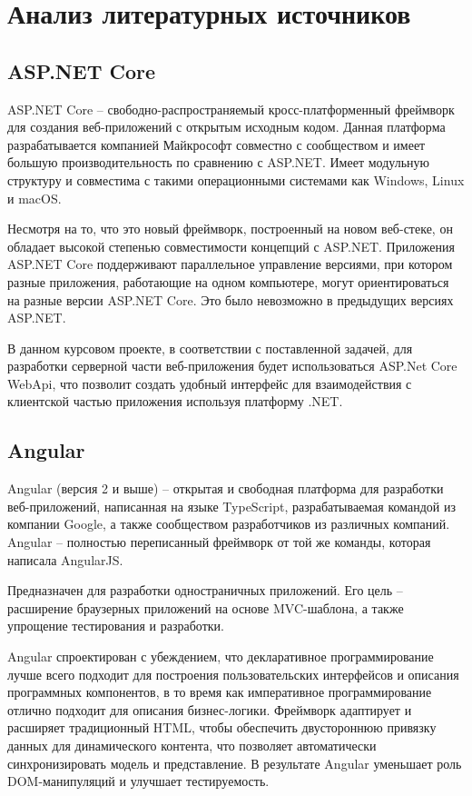 \section{Анализ литературных источников}
\label{sec:literature_analysis}

\subsection{ASP.NET Core}

ASP.NET Core -- свободно-распространяемый кросс-платформенный фреймворк для создания веб-приложений с открытым исходным кодом. Данная платформа разрабатывается компанией Майкрософт совместно с сообществом и имеет большую производительность по сравнению с ASP.NET. Имеет модульную структуру и совместима с такими операционными системами как Windows, Linux и macOS.

Несмотря на то, что это новый фреймворк, построенный на новом веб-стеке, он обладает высокой степенью совместимости концепций с ASP.NET. Приложения ASP.NET Core поддерживают параллельное управление версиями, при котором разные приложения, работающие на одном компьютере, могут ориентироваться на разные версии ASP.NET Core. Это было невозможно в предыдущих версиях ASP.NET.

В данном курсовом проекте, в соответствии с поставленной задачей, для разработки серверной части веб-приложения будет использоваться ASP.Net Core WebApi, что позволит создать удобный интерфейс для взаимодействия с клиентской частью приложения используя платформу .NET.

\subsection{Angular}
Angular (версия 2 и выше) -- открытая и свободная платформа для разработки веб-приложений, написанная на языке TypeScript, разрабатываемая командой из компании Google, а также сообществом разработчиков из различных компаний. Angular -- полностью переписанный фреймворк от той же команды, которая написала AngularJS.

Предназначен для разработки одностраничных приложений. Его цель -- расширение браузерных приложений на основе MVC-шаблона, а также упрощение тестирования и разработки.

Angular спроектирован с убеждением, что декларативное программирование лучше всего подходит для построения пользовательских интерфейсов и описания программных компонентов, в то время как императивное программирование отлично подходит для описания бизнес-логики. Фреймворк адаптирует и расширяет традиционный HTML, чтобы обеспечить двустороннюю привязку данных для динамического контента, что позволяет автоматически синхронизировать модель и представление. В результате Angular уменьшает роль DOM-манипуляций и улучшает тестируемость.

